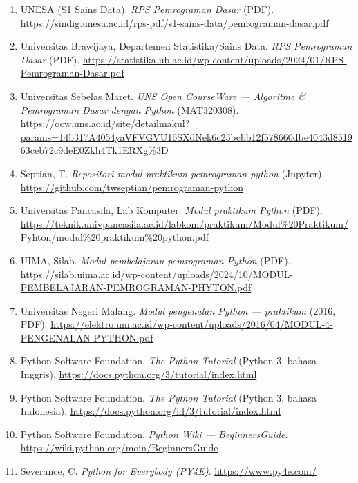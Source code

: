 \documentclass[12pt,a4paper]{article}
\begin{document}
\begin{enumerate}[leftmargin=*]
  \item UNESA (S1 Sains Data). \textit{RPS Pemrograman Dasar} (PDF). \url{https://sindig.unesa.ac.id/rps-pdf/s1-sains-data/pemrograman-dasar.pdf}

  \item Universitas Brawijaya, Departemen Statistika/Sains Data. \textit{RPS Pemrograman Dasar} (PDF). \url{https://statistika.ub.ac.id/wp-content/uploads/2024/01/RPS-Pemrograman-Dasar.pdf}

  \item Universitas Sebelas Maret. \textit{UNS Open CourseWare --- Algoritme \& Pemrograman Dasar dengan Python} (MAT320308). \url{https://ocw.uns.ac.id/site/detailmakul?params=14b317A4054yaVFVGVU16SXdNek6c23bcbb12f578660dbe4043d851963ceb72c9deE0Zkh4Tk1ERXg%3D}

  \item Septian, T. \textit{Repositori modul praktikum pemrograman-python} (Jupyter). \url{https://github.com/twseptian/pemrograman-python}

  \item Universitas Pancasila, Lab Komputer. \textit{Modul praktikum Python} (PDF). \url{https://teknik.univpancasila.ac.id/labkom/praktikum/Modul%20Praktikum/Pyhton/modul%20praktikum%20python.pdf}

  \item UIMA, Silab. \textit{Modul pembelajaran pemrograman Python} (PDF). \url{https://silab.uima.ac.id/wp-content/uploads/2024/10/MODUL-PEMBELAJARAN-PEMROGRAMAN-PHYTON.pdf}

  \item Universitas Negeri Malang. \textit{Modul pengenalan Python --- praktikum} (2016, PDF). \url{https://elektro.um.ac.id/wp-content/uploads/2016/04/MODUL-4-PENGENALAN-PYTHON.pdf}

  \item Python Software Foundation. \textit{The Python Tutorial} (Python 3, bahasa Inggris). \url{https://docs.python.org/3/tutorial/index.html}

  \item Python Software Foundation. \textit{The Python Tutorial} (Python 3, bahasa Indonesia). \url{https://docs.python.org/id/3/tutorial/index.html}

  \item Python Software Foundation. \textit{Python Wiki --- BeginnersGuide}. \url{https://wiki.python.org/moin/BeginnersGuide}

  \item Severance, C. \textit{Python for Everybody (PY4E)}. \url{https://www.py4e.com/}


\end{enumerate}
\end{document}
